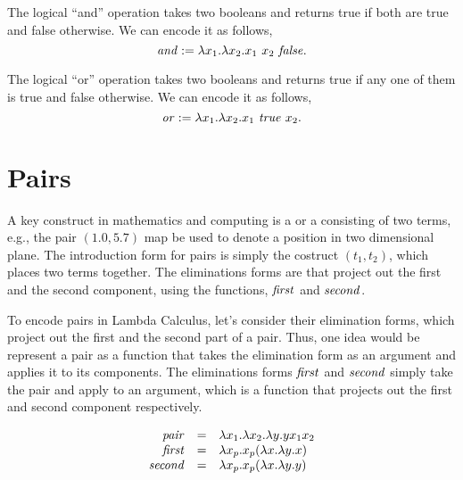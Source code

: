 \begin{gram}
\label{grm:lcc::bools::and}
The logical ``and'' operation takes two booleans and returns true if both are true and false otherwise.
%
We can encode it as follows,
\[
\mathit{and} := \lambda x_1. \lambda x_2. x_1~x_2~\mathit{false}.
\]
\end{gram}

\begin{gram}[Logical Or]
\label{grm:lcc::bools::or}
The logical ``or'' operation takes two booleans and returns true if any one of them is true and false otherwise.
%
We can encode it as follows,
\[
\mathit{or} := \lambda x_1.  \lambda x_2.  x_1~\mathit{true}~x_2.
\]
\end{gram}


\section{Pairs}
\label{sec:lcc:pairs}

A key construct in mathematics and computing is a  or a  consisting of two terms, e.g., the pair $(1.0, 5.7)$ map be used to denote a position in two dimensional plane.
%
The introduction form for pairs is simply the costruct $(t_1, t_2)$, which places two terms together.
%
The eliminations forms are  that project out the first and the second component, using the functions, $\mathit{first}$ and $\mathit{second}$.
 

\begin{gram}
\label{grm:lcc:pairs::encoding}


To encode pairs in Lambda Calculus, let's consider their elimination forms, which project out the first and the second part of a pair.
%
Thus, one idea would be represent a pair as a function that takes the elimination form as an argument and applies it to its components.  
%
The eliminations forms $\mathit{first}$ and $\mathit{second}$ simply take
the pair and apply to an argument, which is a function that projects
out the first and second component respectively.

\[
\begin{array}{rcl}
\mathit{pair} & = &  \lambda x_1. \lambda x_2.  \lambda y. y x_1 x_2\\
\mathit{first}  & = & \lambda x_p. x_p (\lambda x. \lambda y. x)\\
\mathit{second}  & = & \lambda x_p. x_p (\lambda x. \lambda y. y)\\
\end{array}
\]

\end{gram}

